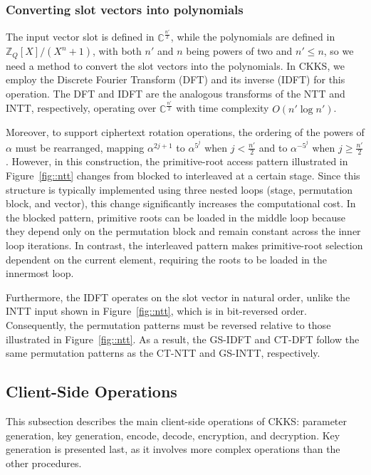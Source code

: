 \subsubsection{Converting slot vectors into polynomials}
\label{ckks::convert}

The input vector slot is defined in $\mathbb{C}^{\frac{n'}{2}}$, while the polynomials are defined in $\mathbb{Z}_Q[X]/(X^n+1)$, with both $n'$ and $n$ being powers of two and $n' \leq n$, so we need a method to convert the slot vectors into the polynomials. In CKKS, we employ the Discrete Fourier Transform (DFT) and its inverse (IDFT) for this operation. The DFT and IDFT are the analogous transforms of the NTT and INTT, respectively, operating over $\mathbb{C}^{\frac{n'}{2}}$ with time complexity $O(n' \log n')$.

Moreover, to support ciphertext rotation operations, the ordering of the powers of $\alpha$ must be rearranged, mapping $\alpha^{2j+1}$ to $\alpha^{5^j}$ when $j < \frac{n'}{2}$ and to $\alpha^{-5^j}$ when $j \geq \frac{n'}{2}$. However, in this construction, the primitive-root access pattern illustrated in Figure~\ref{fig::ntt} changes from blocked to interleaved at a certain stage. Since this structure is typically implemented using three nested loops (stage, permutation block, and vector), this change significantly increases the computational cost. In the blocked pattern, primitive roots can be loaded in the middle loop because they depend only on the permutation block and remain constant across the inner loop iterations. In contrast, the interleaved pattern makes primitive-root selection dependent on the current element, requiring the roots to be loaded in the innermost loop. %

Furthermore, the IDFT operates on the slot vector in natural order, unlike the INTT input shown in Figure~\ref{fig::ntt}, which is in bit-reversed order. Consequently, the permutation patterns must be reversed relative to those illustrated in Figure~\ref{fig::ntt}. As a result, the GS-IDFT and CT-DFT follow the same permutation patterns as the CT-NTT and GS-INTT, respectively.

\subsection{Client-Side Operations}
\label{ckks:client}

This subsection describes the main client-side operations of CKKS: parameter generation, key generation, encode, decode, encryption, and decryption. Key generation is presented last, as it involves more complex operations than the other procedures.

